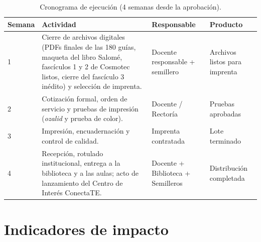 \documentclass[12pt, letterpaper]{article}
\begin{document}
\renewcommand{\arraystretch}{1.25}
\begin{table}[H]
\centering
\small
\begin{tabularx}{\linewidth}{C{1.4cm} L{5.2cm} C{2.0cm} X}
\toprule
{}
\textbf{Semana} & \textbf{Actividad} & \textbf{Responsable} & \textbf{Producto} \\
 & Cierre de archivos digitales (PDFs finales de las 180 guías, maqueta del libro Salomé, fascículos 1 y 2 de Cosmotec listos, cierre del fascículo 3 inédito) y selección de imprenta. & Docente responsable + semillero & Archivos listos para imprenta \\
2 & Cotización formal, orden de servicio y pruebas de impresión (\emph{ozalid} y prueba de color). & Docente / Rectoría & Pruebas aprobadas \\
3 & Impresión, encuadernación y control de calidad. & Imprenta contratada & Lote terminado \\
4 & Recepción, rotulado institucional, entrega a la biblioteca y a las aulas; acto de lanzamiento del Centro de Interés ConectaTE. & Docente + Biblioteca + Semilleros & Distribución completada \\
\bottomrule
\end{tabularx}
\caption{Cronograma de ejecución (4 semanas desde la aprobación).}
\end{table}

\section{Indicadores de impacto}
\end{document}
